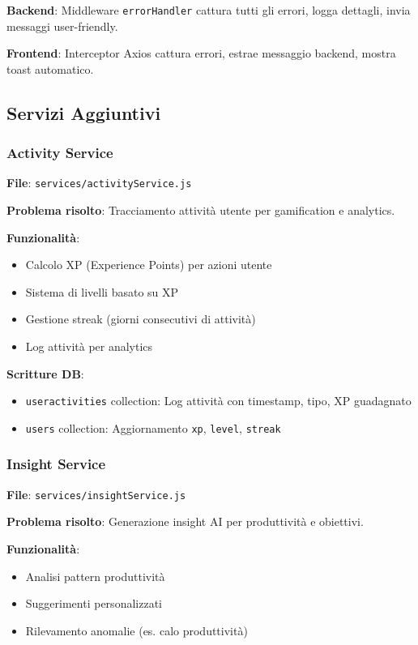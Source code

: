 \documentclass[11pt,a4paper]{article}
\begin{document}
\textbf{Backend}: Middleware \texttt{errorHandler} cattura tutti gli errori, logga dettagli, invia messaggi user-friendly.

\textbf{Frontend}: Interceptor Axios cattura errori, estrae messaggio backend, mostra toast automatico.

\subsection{Servizi Aggiuntivi}

\subsubsection{Activity Service}

\textbf{File}: \texttt{services/activityService.js}

\textbf{Problema risolto}: Tracciamento attività utente per gamification e analytics.

\textbf{Funzionalità}:
\begin{itemize}
    \item Calcolo XP (Experience Points) per azioni utente
    \item Sistema di livelli basato su XP
    \item Gestione streak (giorni consecutivi di attività)
    \item Log attività per analytics
\end{itemize}

\textbf{Scritture DB}:
\begin{itemize}
    \item \texttt{useractivities} collection: Log attività con timestamp, tipo, XP guadagnato
    \item \texttt{users} collection: Aggiornamento \texttt{xp}, \texttt{level}, \texttt{streak}
\end{itemize}

\subsubsection{Insight Service}

\textbf{File}: \texttt{services/insightService.js}

\textbf{Problema risolto}: Generazione insight AI per produttività e obiettivi.

\textbf{Funzionalità}:
\begin{itemize}
    \item Analisi pattern produttività
    \item Suggerimenti personalizzati
    \item Rilevamento anomalie (es. calo produttività)
\end{itemize}
\end{document}
